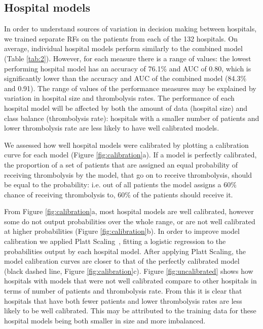 \documentclass[12pt,a4paper, pdftex]{elsarticle}
\begin{document}
\subsection{Hospital models}

In order to understand sources of variation in decision making between hospitals, we trained separate RFs on the patients from each of the 132 hospitals. On average, individual hospital models perform similarly to the combined model (Table \ref{tab:2}). However, for each measure there is a range of values: the lowest performing hospital model has an accuracy of 76.1\% and AUC of 0.80, which is significantly lower than the accuracy and AUC of the combined model (84.3\% and 0.91). The range of values of the performance measures may be explained by variation in hospital size and thrombolysis rates. The performance of each hospital model will be affected by both the amount of data (hospital size) and class balance (thrombolysis rate): hospitals with a smaller number of patients and lower thrombolysis rate are less likely to have well calibrated models.

We assessed how well hospital models were calibrated by plotting a calibration curve for each model (Figure \ref{fig:calibration}a). If a model is perfectly calibrated, the proportion of a set of patients that are assigned an equal probability of receiving thrombolysis by the model, that go on to receive thrombolysis, should be equal to the probability: i.e. out of all patients the model assigns a 60\% chance of receiving thrombolysis to, 60\% of the patients should receive it. 


From Figure \ref{fig:calibration}a, most hospital models are well calibrated, however some do not output probabilities over the whole range, or are not well calibrated at higher probabilities (Figure \ref{fig:calibration}b). In order to improve model calibration we applied Platt Scaling~\cite{platt1999probabilistic}, fitting a logistic regression to the probabilities output by each hospital model. After applying Platt Scaling, the model calibration curves are closer to that of the perfectly calibrated model (black dashed line, Figure \ref{fig:calibration}c). Figure \ref{fig:uncalibrated} shows how hospitals with models that were not well calibrated compare to other hospitals in terms of number of patients and thrombolysis rate. From this it is clear that hospitals that have both fewer patients and lower thrombolysis rates are less likely to be well calibrated. This may be attributed to the training data for these hospital models being both smaller in size and more imbalanced.
\end{document}
